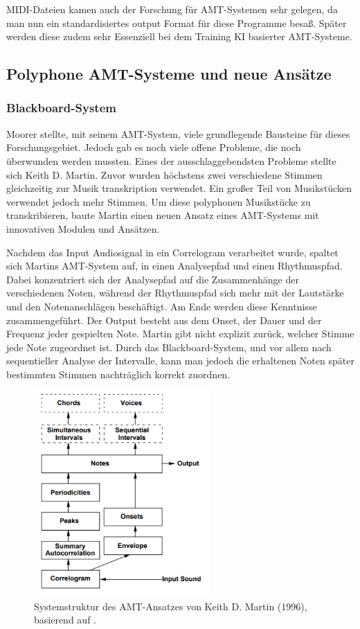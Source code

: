 MIDI-Dateien kamen auch der Forschung für AMT-Systemen sehr gelegen,
da man nun ein standardisiertes output Format für diese Programme besaß.
Später werden diese zudem sehr Essenziell bei dem Training KI basierter AMT-Systeme.
\cite{telila2025cnn}

\subsection{Polyphone AMT-Systeme und neue Ansätze}
\subsubsection{Blackboard-System}
Moorer stellte, mit seinem AMT-System, viele grundlegende Bausteine für dieses Forschungsgebiet.
Jedoch gab es noch viele offene Probleme, die noch überwunden werden mussten.
Eines der ausschlaggebendsten Probleme stellte sich Keith D. Martin.
\cite{Martin1996}
Zuvor wurden höchstens zwei verschiedene Stimmen gleichzeitig zur Musik transkription verwendet.
Ein großer Teil von Musikstücken verwendet jedoch mehr Stimmen.
Um diese polyphonen Musikstücke zu transkribieren,
baute Martin einen neuen Ansatz eines AMT-Systems mit innovativen Modulen und Ansätzen.

Nachdem das Input Audiosignal in ein Correlogram verarbeitet wurde,
spaltet sich Martins AMT-System auf, in einen Analysepfad und einen Rhythmuspfad.
Dabei konzentriert sich der Analysepfad auf die Zusammenhänge der verschiedenen Noten,
während der Rhythmuspfad sich mehr mit der Lautstärke und den Notenanschlägen beschäftigt.
Am Ende werden diese Kenntnisse zusammengeführt.
Der Output besteht aus dem Onset, der Dauer und der Frequenz jeder gespielten Note.
Martin gibt nicht explizit zurück, welcher Stimme jede Note zugeordnet ist.
Durch das Blackboard-System, und vor allem nach sequentieller Analyse der Intervalle, kann man
jedoch die erhaltenen Noten später bestimmten Stimmen nachträglich korrekt zuordnen.

\begin{figure}[H]
    \centering
    \includegraphics[width=0.6\textwidth]{Graphics/Martin1996Structure}
    \caption{Systemstruktur des AMT-Ansatzes von Keith D. Martin (1996), basierend auf \cite{Martin1996}.}
    \label{fig:martin-structure}
\end{figure}

